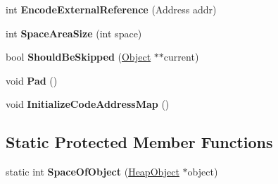 \begin{DoxyCompactItemize}
\item 
\hypertarget{classv8_1_1internal_1_1_serializer_ab710617f1fb4f096d8356d0ae83315c3}{}int {\bfseries Encode\+External\+Reference} (Address addr)\label{classv8_1_1internal_1_1_serializer_ab710617f1fb4f096d8356d0ae83315c3}

\item 
\hypertarget{classv8_1_1internal_1_1_serializer_adbb6bfed182fad83fd7e1836861f218e}{}int {\bfseries Space\+Area\+Size} (int space)\label{classv8_1_1internal_1_1_serializer_adbb6bfed182fad83fd7e1836861f218e}

\item 
\hypertarget{classv8_1_1internal_1_1_serializer_adbbbd81dd54e01c0c32ccd9c013a9432}{}bool {\bfseries Should\+Be\+Skipped} (\hyperlink{classv8_1_1internal_1_1_object}{Object} $\ast$$\ast$current)\label{classv8_1_1internal_1_1_serializer_adbbbd81dd54e01c0c32ccd9c013a9432}

\item 
\hypertarget{classv8_1_1internal_1_1_serializer_a559527d81f46ac224fc0437456958b47}{}void {\bfseries Pad} ()\label{classv8_1_1internal_1_1_serializer_a559527d81f46ac224fc0437456958b47}

\item 
\hypertarget{classv8_1_1internal_1_1_serializer_a02df94cb146e256696d93d0062282d28}{}void {\bfseries Initialize\+Code\+Address\+Map} ()\label{classv8_1_1internal_1_1_serializer_a02df94cb146e256696d93d0062282d28}

\end{DoxyCompactItemize}
\subsection*{Static Protected Member Functions}
\begin{DoxyCompactItemize}
\item 
\hypertarget{classv8_1_1internal_1_1_serializer_a926fafcf15a0bd5f9b88e2b57685306f}{}static int {\bfseries Space\+Of\+Object} (\hyperlink{classv8_1_1internal_1_1_heap_object}{Heap\+Object} $\ast$object)\label{classv8_1_1internal_1_1_serializer_a926fafcf15a0bd5f9b88e2b57685306f}

\end{DoxyCompactItemize}
